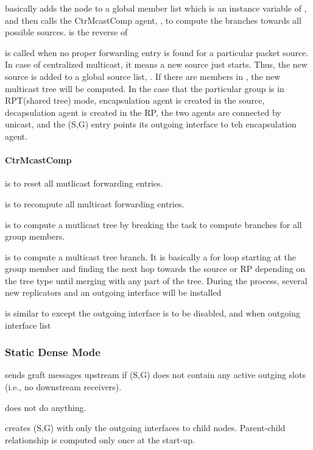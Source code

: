  basically adds the node to a global member list
 which is an instance variable of , and
then calls the CtrMcastComp agent, , to compute the branches
towards all possible sources.  is the reverse of

 is called when no proper forwarding entry is
found for a particular packet source.  In case of centralized multicast,
it means a new source just starts.  Thus, the new source is added to a
global source list, .  If there are members in ,
the new multicast tree will be computed. In the case that the particular
group is in RPT(shared tree) mode, encapsulation agent is created in the
source, decapsulation agent is created in the RP, the two agents are
connected by unicast, and the (S,G) entry points its outgoing interface to
teh encapsulation agent.

\paragraph{CtrMcastComp}
\label{CtrMcastComp}
 is to reset all mutlicast forwarding entries.

 is to recompute all multicast forwarding entries.

 is to compute a mutlicast tree by breaking the task
to compute branches for all group members.

 is to compute a multicast tree branch.  It is
basically a for loop starting at the group member and finding the next hop
towards the source or RP depending on the tree type until merging with any
part of the tree. During the process, several new replicators and an
outgoing interface will be installed 

 is similar to  except the
outgoing interface is to be disabled, and when outgoing interface list 


\subsubsection{Static Dense Mode}
 sends graft messages upstream if (S,G) does not
contain any active outging slots (i.e., no downstream receivers).

 does not do anything.

 creates (S,G) with only the outgoing interfaces
to child nodes. Parent-child relationship is computed only once at the
start-up.

